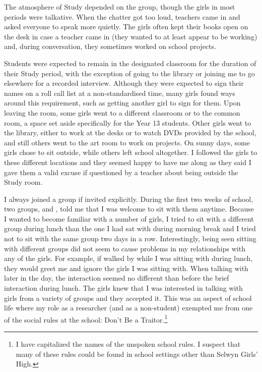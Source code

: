 The atmosphere of Study depended on the group, though the girls in most periods were talkative. When the chatter got too loud, teachers came in and asked everyone to speak more quietly. The girls often kept their books open on the desk in case a teacher came in (they wanted to at least appear to be working) and, during conversation, they sometimes worked on school projects.

Students were expected to remain in the designated classroom for the duration of their Study period, with the exception of going to the library or joining me to go elsewhere for a recorded interview. Although they were expected to sign their names on a roll call list at a non-standardised time, many girls found ways around this requirement, such as getting another girl to sign for them. Upon leaving the room, some girls went to a different classroom or to the common room, a space set aside specifically for the Year 13 students. Other girls went to the library, either to work at the desks or to watch DVDs provided by the school, and still others went to the art room to work on projects. On sunny days, some girls chose to sit outside, while others left school altogether. I followed the girls to these different locations and they seemed happy to have me along as they said I gave them a valid excuse if questioned by a teacher about being outside the Study room.


I always joined a group if invited explicitly. During the first two weeks of school, two groups,  and , told me that I was welcome to sit with them anytime. Because I wanted to become familiar with a number of girls, I tried to sit with a different group during lunch than the one I had sat with during morning break and I tried not to sit with the same group two days in a row. Interestingly, being seen sitting with different groups did not seem to cause problems in my relationships with any of the girls. For example, if  walked by while I was sitting with  during lunch, they would greet me and ignore the girls I was sitting with. When talking with  later in the day, the interaction seemed no different than before the brief interaction during lunch. The girls knew that I was interested in talking with girls from a variety of groups and they accepted it. This was an aspect of school life where my role as a researcher (and as a non-student) exempted me from one of the social rules at the school: Don't Be a Traitor.\footnote{I have capitalized the names of the unspoken school rules. I suspect that many of these rules could be found in school settings other than Selwyn Girls' High.}

